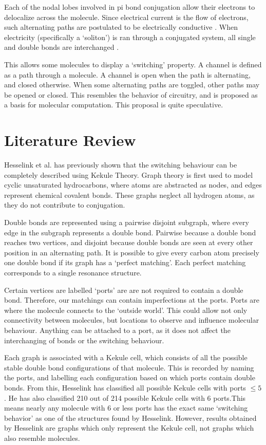\documentclass[12pt]{article}
\begin{document}
Each of the nodal lobes involved in pi bond conjugation allow their electrons to delocalize across the molecule. Since electrical current is the flow of electrons, such alternating paths are postulated to be electrically conductive \cite{H13,HK88}. When electricity (specifically a `soliton') is ran through a conjugated system, all single and double bonds are interchanged \cite{HK88}. 

This allows some molecules to display a `switching' property. A channel is defined as a path through a molecule. A channel is open when the path is alternating, and closed otherwise. When some alternating paths are toggled, other paths may be opened or closed. This resembles the behavior of circuitry, and is proposed as a basis for molecular computation. This proposal is quite speculative.

\section{Literature Review}

	Hesselink et al. \cite{H13,HH13} has previously shown that the switching behaviour can be completely described using Kekule Theory. Graph theory is first used to model cyclic unsaturated hydrocarbons, where atoms are abstracted as nodes, and edges represent  chemical covalent bonds. These graphs neglect all hydrogen atoms, as they do not contribute to conjugation. 

Double bonds are represented using a pairwise disjoint subgraph, where every edge in the subgraph represents a double bond. Pairwise because a double bond reaches two vertices, and disjoint because double bonds are seen at every other position in an alternating path. It is possible to give every carbon atom precisely one double bond if its graph has a `perfect matching'. Each perfect matching corresponds to a single resonance structure. 

Certain vertices are labelled `ports' are are not required to contain a double bond. Therefore, our matchings can contain imperfections at the ports.  Ports are where the molecule connects to the `outside world'. This could allow not only connectivity between molecules, but locations to observe and influence molecular behaviour. Anything can be attached to a port, as it does not affect the interchanging of bonds or the switching behaviour.

Each graph is associated with a Kekule cell, which consists of all the possible stable double bond configurations of that molecule. This is recorded by naming the ports, and labelling each configuration based on which ports contain double bonds. From this, Hesselink has classified all possible Kekule cells with ports $ \leq 5$. He has also classified 210 out of 214 possible Kekule cells with 6 ports.This means nearly any molecule with 6 or less ports has the exact same `switching behavior' as one of the structures found by Hesselink. However, results obtained by Hesselink are graphs which only represent the Kekule cell, not graphs which also resemble molecules. 
	                 
\end{document}
